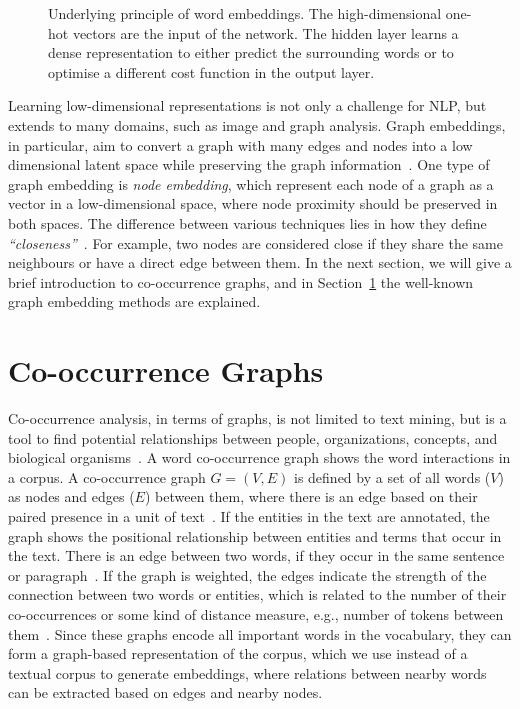 \begin{figure}
\centering 
\resizebox{0.8\textwidth}{0.48\textwidth}{      

}
\caption{Underlying principle of word embeddings. The high-dimensional one-hot vectors are the input of the network. The hidden layer learns a dense representation to either predict the surrounding words or to optimise a different cost function in the output layer.}
\label{fig:emb}
\end{figure}
\noindent
Learning low-dimensional representations is not only a challenge for NLP, but extends to many domains, such as image and graph analysis. Graph embeddings, in particular,  aim to convert a graph with many edges and nodes into a low dimensional latent space while preserving the graph information~. One type of graph embedding is \emph{node embedding}, which represent each node of a graph as a vector in a low-dimensional space, where node proximity should be preserved in both spaces.
The difference between various techniques lies in how they define \emph{``closeness''}~. For example, two nodes are considered close if they share the same neighbours or have a direct edge between them. In the next section, we will give a brief introduction to co-occurrence graphs, and in Section~\ref{sec:graph} the well-known graph embedding methods are explained.  

\section{Co-occurrence Graphs}
\label{sec:graph}
Co-occurrence analysis, in terms of graphs, is not limited to text mining, but is a tool to find potential relationships between people, organizations, concepts, and biological organisms~. A word co-occurrence graph shows the word interactions in a corpus. A co-occurrence graph $G=(V,E)$ is defined by a set of all words ($V$) as nodes and edges ($E$) between them, where there is an edge based on their paired presence in a unit of text~. If the entities in the text are annotated, the graph shows the positional relationship between entities and terms that occur in the text. There is an edge between two words, if they occur in the same sentence or paragraph~. If the graph is weighted, the edges indicate the strength of the connection between two words or entities, which is related to the number of their co-occurrences or some kind of distance measure, e.g., number of tokens between them~. Since these graphs encode all important words in the vocabulary, they can form a graph-based representation of the corpus, which we use instead of a textual corpus to generate embeddings, where relations between nearby words can be extracted based on edges and nearby nodes.\\

